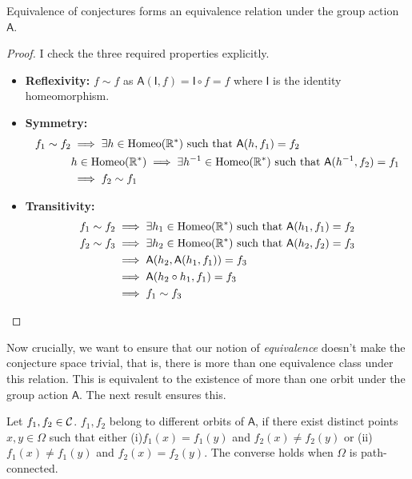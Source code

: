 \begin{prop}
    Equivalence of conjectures forms an equivalence relation under the group action $\mathsf{A}$.
\end{prop}
\begin{proof}
    I check the three required properties explicitly.
    \begin{itemize}
        \item \textbf{Reflexivity:} $f\sim f$ as $\mathsf{A}(\mathsf{I}, f) = \mathsf{I}\circ f = f$ where $\mathsf{I}$ is the identity homeomorphism.
        \item \textbf{Symmetry:} 
            \begin{align*}
                f_1\sim f_2 &\implies \exists h\in\text{Homeo}(\mathbb{R}^*) \text{ such that } \mathsf{A}(h, f_1) = f_2\\
                &h\in\text{Homeo}(\mathbb{R}^*)\implies \exists h^{-1}\in\text{Homeo}(\mathbb{R}^*) \text{ such that } \mathsf{A}(h^{-1}, f_2) = f_1\\
                &\implies f_2\sim f_1
            \end{align*}
        \item \textbf{Transitivity:}
            \begin{align*}
                f_1\sim f_2 &\implies \exists h_1\in\text{Homeo}(\mathbb{R}^*) \text{ such that } \mathsf{A}(h_1, f_1) = f_2\\
                f_2\sim f_3 &\implies \exists h_2\in\text{Homeo}(\mathbb{R}^*) \text{ such that } \mathsf{A}(h_2, f_2) = f_3\\
                &\implies \mathsf{A}(h_2, \mathsf{A}(h_1, f_1)) = f_3\\
                &\implies \mathsf{A}(h_2\circ h_1, f_1) = f_3\\
                &\implies f_1\sim f_3    
            \end{align*}
    \end{itemize}
\end{proof}

Now crucially, we want to ensure that our notion of \textit{equivalence} doesn't make the conjecture space trivial, that is, there is more than one equivalence class under this relation. This is equivalent to the existence of more than one orbit under the group action $\mathsf{A}$.
The next result ensures this.

\begin{theorem}
    Let $f_1, f_2\in\mathcal{C}$. $f_1,f_2$ belong to different orbits of $\mathsf{A}$, if there exist distinct points $x,y\in\Omega$ such that either (i)$f_1(x) = f_1(y)$ and $f_2(x)\neq f_2(y)$ or (ii)$f_1(x)\neq f_1(y)$ and $f_2(x) = f_2(y)$. The converse holds when $\Omega$ is path-connected.
\end{theorem}


